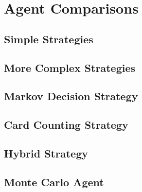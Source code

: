 
\section{Agent Comparisons}


\subsection{Simple Strategies}



\subsection{More Complex Strategies}



\subsection{Markov Decision Strategy}



\subsection{Card Counting Strategy}



\subsection{Hybrid Strategy}



\subsection{Monte Carlo Agent}

